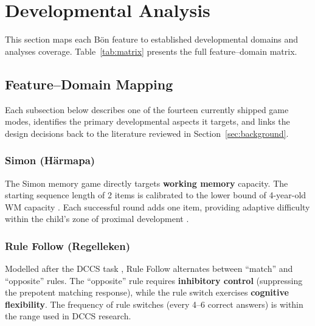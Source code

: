 \documentclass[12pt, a4paper]{article}
\newcommand{\Bodn}{B\"o\dh{}n}
\begin{document}
\section{Developmental Analysis}
\label{sec:analysis}

This section maps each \Bodn{} feature to established developmental domains and
analyses coverage. Table~\ref{tab:matrix} presents the full feature--domain
matrix.

\subsection{Feature--Domain Mapping}
\label{sec:mapping}

Each subsection below describes one of the fourteen currently shipped game
modes, identifies the primary developmental aspects it targets, and links the
design decisions back to the literature reviewed in Section~\ref{sec:background}.

\subsubsection{Simon (H\"armapa)}
The Simon memory game directly targets \textbf{working memory} capacity. The
starting sequence length of 2 items is calibrated to the lower bound of
4-year-old WM capacity \citep{diamond2013executive}. Each successful round
adds one item, providing adaptive difficulty within the child's zone of
proximal development \citep{vygotsky1978mind}.

\subsubsection{Rule Follow (Regelleken)}
Modelled after the DCCS task \citep{zelazo2006dccs}, Rule Follow alternates
between ``match'' and ``opposite'' rules. The ``opposite'' rule requires
\textbf{inhibitory control} (suppressing the prepotent matching response), while
the rule switch exercises \textbf{cognitive flexibility}. The frequency of rule
switches (every 4--6 correct answers) is within the range used in DCCS research.
\end{document}
